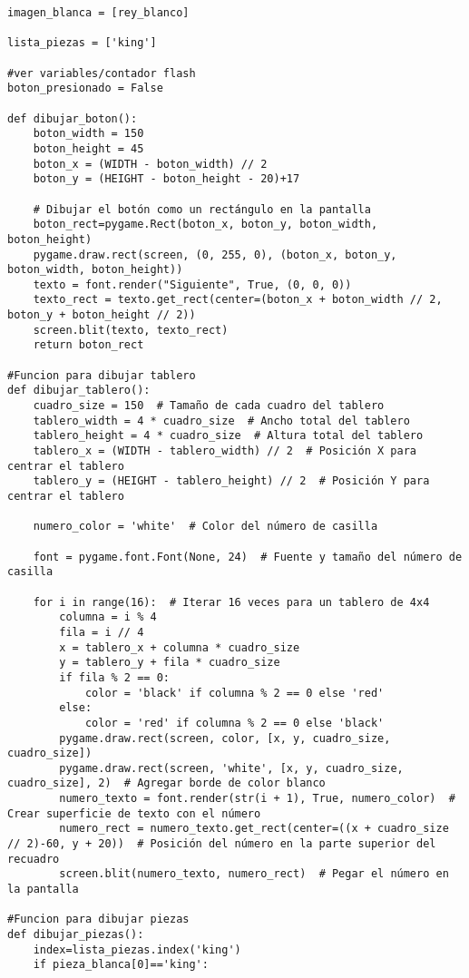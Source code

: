 \begin{lstlisting}
imagen_blanca = [rey_blanco]

lista_piezas = ['king']

#ver variables/contador flash
boton_presionado = False

def dibujar_boton():
    boton_width = 150
    boton_height = 45
    boton_x = (WIDTH - boton_width) // 2
    boton_y = (HEIGHT - boton_height - 20)+17

    # Dibujar el botón como un rectángulo en la pantalla
    boton_rect=pygame.Rect(boton_x, boton_y, boton_width, boton_height)
    pygame.draw.rect(screen, (0, 255, 0), (boton_x, boton_y, boton_width, boton_height))
    texto = font.render("Siguiente", True, (0, 0, 0))
    texto_rect = texto.get_rect(center=(boton_x + boton_width // 2, boton_y + boton_height // 2))
    screen.blit(texto, texto_rect)
    return boton_rect
    
#Funcion para dibujar tablero
def dibujar_tablero():
    cuadro_size = 150  # Tamaño de cada cuadro del tablero
    tablero_width = 4 * cuadro_size  # Ancho total del tablero
    tablero_height = 4 * cuadro_size  # Altura total del tablero
    tablero_x = (WIDTH - tablero_width) // 2  # Posición X para centrar el tablero
    tablero_y = (HEIGHT - tablero_height) // 2  # Posición Y para centrar el tablero
    
    numero_color = 'white'  # Color del número de casilla

    font = pygame.font.Font(None, 24)  # Fuente y tamaño del número de casilla

    for i in range(16):  # Iterar 16 veces para un tablero de 4x4
        columna = i % 4
        fila = i // 4
        x = tablero_x + columna * cuadro_size
        y = tablero_y + fila * cuadro_size
        if fila % 2 == 0:
            color = 'black' if columna % 2 == 0 else 'red'
        else:
            color = 'red' if columna % 2 == 0 else 'black'
        pygame.draw.rect(screen, color, [x, y, cuadro_size, cuadro_size])
        pygame.draw.rect(screen, 'white', [x, y, cuadro_size, cuadro_size], 2)  # Agregar borde de color blanco
        numero_texto = font.render(str(i + 1), True, numero_color)  # Crear superficie de texto con el número
        numero_rect = numero_texto.get_rect(center=((x + cuadro_size // 2)-60, y + 20))  # Posición del número en la parte superior del recuadro
        screen.blit(numero_texto, numero_rect)  # Pegar el número en la pantalla

#Funcion para dibujar piezas
def dibujar_piezas():
    index=lista_piezas.index('king')
    if pieza_blanca[0]=='king':     
        

\end{lstlisting}
